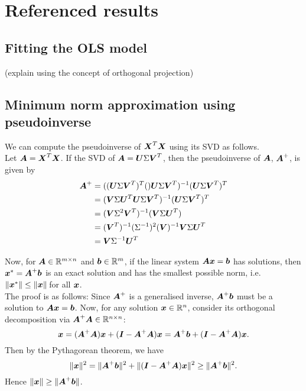 \documentclass[12pt]{article}
\newcommand{\Sg}{\Sigma}
\begin{document}
	\section{Referenced results}
	\subsection{Fitting the OLS model\label{sec:append1}}
	(explain using the concept of orthogonal projection)
	
	\subsection{Minimum norm approximation using pseudoinverse\label{sec:append2}}
	We can compute the pseudoinverse of $\boldsymbol{X}^T\boldsymbol{X}$ using its SVD as follows.\\
	
	Let $\boldsymbol{A}=\boldsymbol{X}^T\boldsymbol{X}$. If the SVD of $\bmA=\bmU\Sg\bmV^T$, then the pseudoinverse of $\boldsymbol{A}$, $\boldsymbol{A}^+$, is given by
	\begin{align*}
		\bmA^+&=((\bmU\Sg\bmV^T)^T()\bmU\Sg\bmV^T)^{-1}(\bmU\Sg\bmV^T)^T\\
		&=(\bmV\Sg\bmU^T\bmU\Sg\bmV^T)^{-1}(\bmU\Sg\bmV^T)^T\\
		&=(\bmV\Sg^2\bmV^T)^{-1}(\bmV\Sg\bmU^T)\\
		&=(\bmV^T)^{-1}(\Sg^{-1})^2(\bmV)^{-1}\bmV\Sg\bmU^T\\
		&=\bmV\Sg^{-1}\bmU^T
	\end{align*}
	
	Now, for $\bmA\in\RR^{m\times n}$ and $\bmb\in\RR^m$, if the linear system $\boldsymbol{A}\boldsymbol{x}=\boldsymbol{b}$ has solutions, then $\boldsymbol{x}^*=\boldsymbol{A}^+\boldsymbol{b}$ is an exact solution and has the smallest possible norm, i.e. $\|\boldsymbol{x}^*\|\leq\|\boldsymbol{x}\|\, $for all $\boldsymbol{x}$.\\
	
	The proof is as follows: Since $\boldsymbol{A}^+$ is a generalised inverse, $\boldsymbol{A}^+\boldsymbol{b}$ must be a solution to $\boldsymbol{A}\boldsymbol{x}=\boldsymbol{b}$. Now, for any solution $\bmx\in\Rn$, consider its orthogonal decomposition via $\bmA^+\bmA\in\RR^{n\times n}$:
	$$\boldsymbol{x}=(\boldsymbol{A}^+\boldsymbol{A})\boldsymbol{x}+(\boldsymbol{I}-\boldsymbol{A}^+\boldsymbol{A})\boldsymbol{x}=\boldsymbol{A}^+\boldsymbol{b}+(\boldsymbol{I}-\boldsymbol{A}^+\boldsymbol{A})\boldsymbol{x}.$$
	Then by the Pythagorean theorem, we have
	$$\|\boldsymbol{x}\|^2=\|\boldsymbol{A}^+\boldsymbol{b}\|^2+\|(\boldsymbol{I}-\boldsymbol{A}^+\boldsymbol{A})\boldsymbol{x}\|^2\geq \|\boldsymbol{A}^+\boldsymbol{b}\|^2.$$
	Hence $\|\boldsymbol{x}\|\geq\|\boldsymbol{A}^+\boldsymbol{b}\|$.
	
\end{document}
